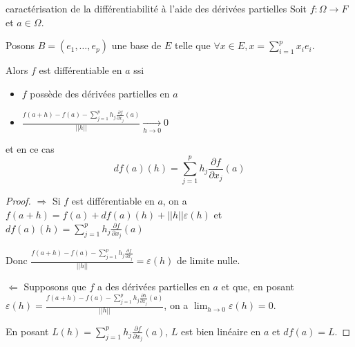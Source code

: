 \begin{propositionnt}{caractérisation de la différentiabilité à l'aide des dérivées partielles}{}
    Soit $f : \Omega \to F$ et $a \in \Omega$. 

    Posons $B = (e_1, \ldots, e_p)$ une base de $E$ telle que $\forall x \in E, 
    x = \sum_{i = 1 }^{p } x_i e_i$. 

    Alors $f$ est différentiable en $a$ ssi 
    \begin{itemize}
        \item $f$ possède des dérivées partielles en $a$
        \item $\displaystyle \frac{f(a + h) - f(a) - \sum_{j = 1 }^{p } h_j \frac{\partial f }{\partial x_j } (a)}{||h||} \xrightarrow[h \to 0 ]{} 0$
    \end{itemize}

    et en ce cas 
    $$df(a)(h) = \sum_{j = 1 }^{p } h_j \frac{\partial f}{\partial x_j} (a)$$
\end{propositionnt}

\begin{proof}
    $\Rightarrow$ Si $f$ est différentiable en $a$, on a $f(a + h) = f(a) + df(a)(h) + ||h|| \varepsilon (h)$
    et $\displaystyle df(a)(h) = \sum_{j = 1 }^{p } h_j \frac{\partial f}{\partial x_j} (a)$

    Donc $\displaystyle \frac{f(a + h) - f(a) - \sum_{j = 1 }^{p } h_j \frac{\partial f }{\partial x_j}}{||h|| } = \varepsilon (h)$ de 
    limite nulle. 

    \lvspace 
    
    $\Leftarrow$ Supposons que $f$ a des dérivées partielles en $a$ et que, en posant 
    $\varepsilon(h) = \displaystyle \frac{f(a + h) - f(a) - \sum_{j = 1 }^{p } h_j \frac{\partial h }{\partial x_j }(a) }{ ||h|| }$, 
    on a $\displaystyle \lim_{h \to 0 } \varepsilon (h) = 0$.
    
    En posant $\displaystyle L(h) = \sum_{j = 1 }^{p } h_j \frac{\partial f}{\partial x_j} (a)$, $L$ est 
    bien linéaire en $a$ et $df(a) = L$. 
\end{proof}


